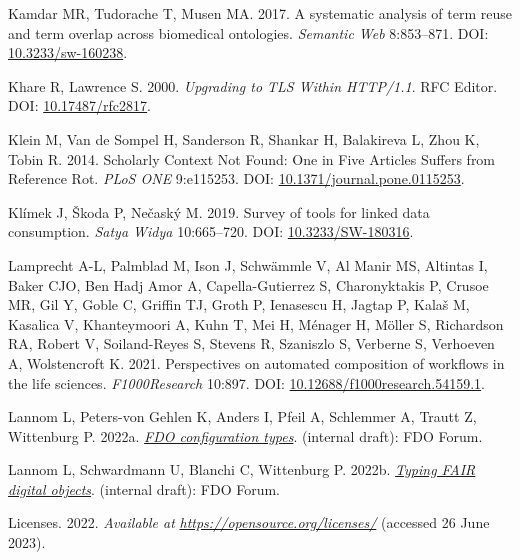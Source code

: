 \begin{CSLReferences}{1}{0}
\leavevmode{}%
Kamdar MR, Tudorache T, Musen MA. 2017. A systematic analysis of term reuse and term overlap across biomedical ontologies. \emph{Semantic Web} 8:853--871. DOI: \href{https://doi.org/10.3233/sw-160238}{10.3233/sw-160238}.

\leavevmode{}%
Khare R, Lawrence S. 2000. \emph{Upgrading to TLS Within HTTP/1.1}. RFC Editor. DOI: \href{https://doi.org/10.17487/rfc2817}{10.17487/rfc2817}.

\leavevmode{}%
Klein M, Van de Sompel H, Sanderson R, Shankar H, Balakireva L, Zhou K, Tobin R. 2014. Scholarly Context Not Found: One in Five Articles Suffers from Reference Rot. \emph{PLoS ONE} 9:e115253. DOI: \href{https://doi.org/10.1371/journal.pone.0115253}{10.1371/journal.pone.0115253}.

\leavevmode{}%
Klímek J, Škoda P, Nečaský M. 2019. Survey of tools for linked data consumption. \emph{Satya Widya} 10:665--720. DOI: \href{https://doi.org/10.3233/SW-180316}{10.3233/SW-180316}.

\leavevmode{}%
Lamprecht A-L, Palmblad M, Ison J, Schwämmle V, Al Manir MS, Altintas I, Baker CJO, Ben Hadj Amor A, Capella-Gutierrez S, Charonyktakis P, Crusoe MR, Gil Y, Goble C, Griffin TJ, Groth P, Ienasescu H, Jagtap P, Kalaš M, Kasalica V, Khanteymoori A, Kuhn T, Mei H, Ménager H, Möller S, Richardson RA, Robert V, Soiland-Reyes S, Stevens R, Szaniszlo S, Verberne S, Verhoeven A, Wolstencroft K. 2021. Perspectives on automated composition of workflows in the life sciences. \emph{F1000Research} 10:897. DOI: \href{https://doi.org/10.12688/f1000research.54159.1}{10.12688/f1000research.54159.1}.

\leavevmode{}%
Lannom L, Peters-von Gehlen K, Anders I, Pfeil A, Schlemmer A, Trautt Z, Wittenburg P. 2022a. \emph{\href{https://docs.google.com/document/d/1ivvg3C_QWSO9PIQwkKT89xG4fBhNAs7_6b0Dz11EwDg/edit}{FDO configuration types}}. (internal draft): FDO Forum.

\leavevmode{}%
Lannom L, Schwardmann U, Blanchi C, Wittenburg P. 2022b. \emph{\href{https://docs.google.com/document/d/1X0hcOVIqP7iYIJf9u-7x3RwcXK8ecsauy0FZg_6-Bg0/edit}{Typing FAIR digital objects}}. (internal draft): FDO Forum.

\leavevmode{}%
Licenses. 2022. \emph{Available at} \href{https://opensource.org/licenses/}{\emph{https://opensource.org/licenses/}} (accessed 26 June 2023).


\end{CSLReferences}
